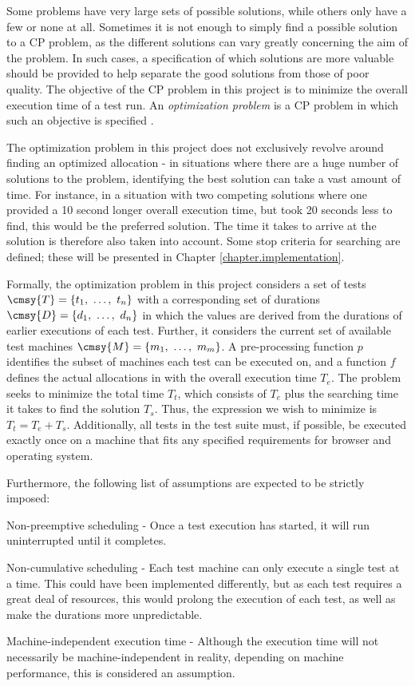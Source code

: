 Some problems have very large sets of possible solutions, while others only have a few or none at all. Sometimes it is not enough to simply find a possible solution to a CP problem, as the different solutions can vary greatly concerning the aim of the problem. In such cases, a specification of which solutions are more valuable should be provided to help separate the good solutions from those of poor quality. The objective of the CP problem in this project is to minimize the overall execution time of a test run. An \emph{optimization problem} is a CP problem in which such an objective is specified \cite{MortensBok}.

The optimization problem in this project does not exclusively revolve around finding an optimized allocation - in situations where there are a huge number of solutions to the problem, identifying the best solution can take a vast amount of time. For instance, in a situation with two competing solutions where one provided a 10 second longer overall execution time, but took 20 seconds less to find, this would be the preferred solution. The time it takes to arrive at the solution is therefore also taken into account. Some stop criteria for searching are defined; these will be presented in Chapter \ref{chapter.implementation}.

Formally, the optimization problem in this project considers a set of tests $\cmsy{T} = \{t_{1},\ \dots,\ t_{n}\}$ with a corresponding set of durations $\cmsy{D} = \{d_{1},\ \dots,\ d_{n}\}$ in which the values are derived from the durations of earlier executions of each test. Further, it considers the current set of available test machines $\cmsy{M} = \{m_{1},\ \dots,\ m_{m}\}$. A pre-processing function $p$ identifies the subset of machines each test can be executed on, and a function $f$ defines the actual allocations in with the overall execution time $T_{e}$. The problem seeks to minimize the total time $T_{t}$, which consists of $T_{e}$ plus the searching time it takes to find the solution $T_{s}$. Thus, the expression we wish to minimize is $T_{t} = T_{e} + T_{s}$. Additionally, all tests in the test suite must, if possible, be executed exactly once on a machine that fits any specified requirements for browser and operating system.

Furthermore, the following list of assumptions are expected to be strictly imposed:

\begin{Description}
    \item[Non-preemptive scheduling]- Once a test execution has started, it will run uninterrupted until it completes.
    \item[Non-cumulative scheduling]- Each test machine can only execute a single test at a time. This could have been implemented differently, but as each test requires a great deal of resources, this would prolong the execution of each test, as well as make the durations more unpredictable.
    \item[Machine-independent execution time]- Although the execution time will not necessarily be machine-independent in reality, depending on machine performance, this is considered an assumption.
\end{Description}

